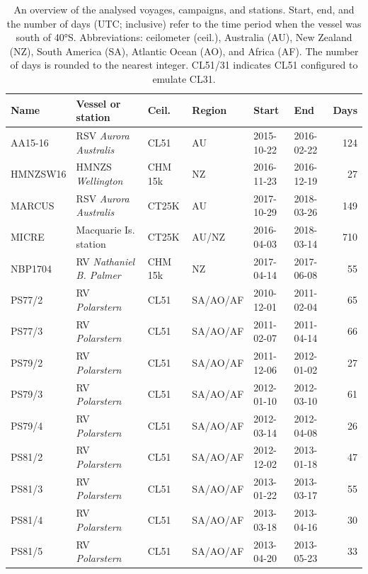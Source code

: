 \documentclass[draft]{agujournal2019}
\begin{document}
\begin{table}[p!]
\caption{
An overview of the analysed voyages, campaigns, and stations. Start, end, and
the number of days (UTC; inclusive) refer to the time period when the vessel
was south of 40°S.  Abbreviations: ceilometer (ceil.), Australia (AU), New
Zealand (NZ), South America (SA), Atlantic Ocean (AO), and Africa (AF). The
number of days is rounded to the nearest integer. CL51/31 indicates CL51
configured to emulate CL31.
}
\label{tab:voyages}
\centering
\small
\begin{tabular}{llllllr}
\textbf{Name} & \textbf{Vessel or station} & \textbf{Ceil.} & \textbf{Region} & \textbf{Start} & \textbf{End} & \textbf{Days}\\
\hline
AA15-16  & RSV \emph{Aurora Australis}   & CL51    & AU       & 2015-10-22 & 2016-02-22 & 124 \\
HMNZSW16 & HMNZS \emph{Wellington}       & CHM 15k & NZ       & 2016-11-23 & 2016-12-19 & 27 \\
MARCUS   & RSV \emph{Aurora Australis}   & CT25K   & AU       & 2017-10-29 & 2018-03-26 & 149 \\
MICRE    & Macquarie Is. station         & CT25K   & AU/NZ    & 2016-04-03 & 2018-03-14 & 710 \\
NBP1704  & RV \emph{Nathaniel B. Palmer} & CHM 15k & NZ       & 2017-04-14 & 2017-06-08 & 55 \\
PS77/2   & RV \emph{Polarstern}          & CL51    & SA/AO/AF & 2010-12-01 & 2011-02-04 & 65 \\
PS77/3   & RV \emph{Polarstern}          & CL51    & SA/AO/AF & 2011-02-07 & 2011-04-14 & 66 \\
PS79/2   & RV \emph{Polarstern}          & CL51    & SA/AO/AF & 2011-12-06 & 2012-01-02 & 27 \\
PS79/3   & RV \emph{Polarstern}          & CL51    & SA/AO/AF & 2012-01-10 & 2012-03-10 & 61 \\
PS79/4   & RV \emph{Polarstern}          & CL51    & SA/AO/AF & 2012-03-14 & 2012-04-08 & 26 \\
PS81/2   & RV \emph{Polarstern}          & CL51    & SA/AO/AF & 2012-12-02 & 2013-01-18 & 47 \\
PS81/3   & RV \emph{Polarstern}          & CL51    & SA/AO/AF & 2013-01-22 & 2013-03-17 & 55 \\
PS81/4   & RV \emph{Polarstern}          & CL51    & SA/AO/AF & 2013-03-18 & 2013-04-16 & 30 \\
PS81/5   & RV \emph{Polarstern}          & CL51    & SA/AO/AF & 2013-04-20 & 2013-05-23 & 33 \\

\end{tabular}
\end{table}
\end{document}
